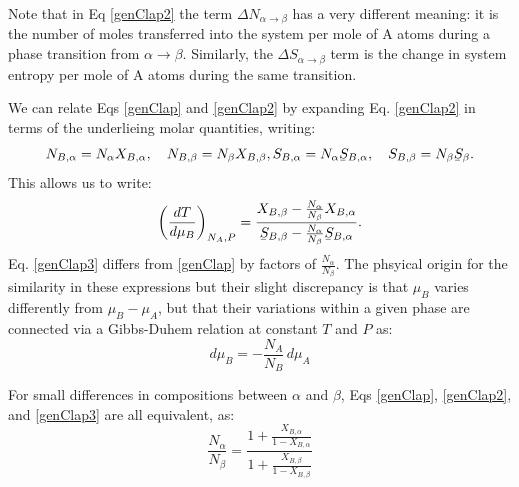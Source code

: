 \documentclass[12pt]{article}
\newcommand\munderbar[1]{%
  \underaccent{\bar}{#1}}
\begin{document}
Note that in Eq \ref{genClap2} the term $\Delta N_{\alpha \to \beta}$ has a very different meaning: it is the number of moles transferred into the system per mole of A atoms during a phase transition from $\alpha \to \beta$. Similarly, the $\Delta S_{\alpha \to \beta}$ term is the change in system entropy per mole of A atoms during the same transition.

We can relate Eqs \ref{genClap} and \ref{genClap2} by expanding Eq. \ref{genClap2} in terms of the underlieing molar quantities,
writing:
\begin{equation*}
N_{B,\alpha}=N_\alpha X_{B,\alpha}, \quad N_{B,\beta}=N_\beta X_{B,\beta}, \\
S_{B,\alpha}=N_\alpha \munderbar{S}_{B,\alpha}, \quad S_{B,\beta}=N_\beta \munderbar{S}_\beta.
\end{equation*}
This allows us to write:
\begin{equation}
\left(\frac{dT}{d\mu_B}\right)_{N_A,P}=\frac{X_{B,\beta}-\frac{N_\alpha}{N_\beta}X_{B,\alpha}}{\munderbar{S}_{B,\beta}-\frac{N_\alpha}{N_\beta}\munderbar{S}_{B,\alpha}}. \label{genClap3}
\end{equation}
Eq. \ref{genClap3} differs from \ref{genClap} by factors of $\frac{N_\alpha}{N_\beta}$. The phsyical origin for the similarity in these expressions but their slight discrepancy is that $\mu_B$ varies differently from $\mu_B-\mu_A$, but that their variations within a given phase are connected via a Gibbs-Duhem relation at constant $T$ and $P$ as:
$$d\mu_B = -\frac{N_A}{N_B} \, d\mu_A$$

For small differences in compositions between $\alpha$ and $\beta$, Eqs \ref{genClap}, \ref{genClap2}, and \ref{genClap3} are all equivalent, as:
$$\frac{N_\alpha}{N_\beta}=\frac{1+\frac{X_{B,\alpha}}{1-X_{B,\alpha}}}{1+\frac{X_{B,\beta}}{1-X_{B,\beta}}}$$
%
\end{document}

